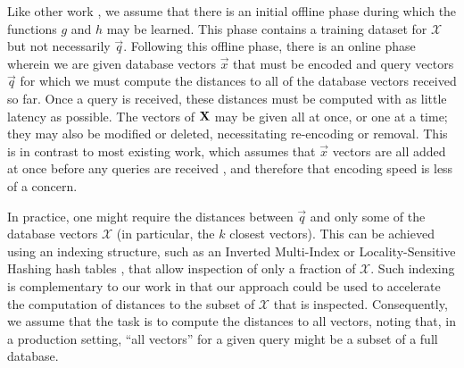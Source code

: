 Like other work \cite{pq,lsq,otq,opq,cq}, we assume that there is an initial offline phase during which the functions $g$ and $h$ may be learned. This phase contains a training dataset for $\mathcal{X}$ but not necessarily $\vec{q}$. Following this offline phase, there is an online phase wherein we are given database vectors $\vec{x}$ that must be encoded and query vectors $\vec{q}$ for which we must compute the distances to all of the database vectors received so far. Once a query is received, these distances must be computed with as little latency as possible. The vectors of $\mathbf{X}$ may be given all at once, or one at a time; they may also be modified or deleted, necessitating re-encoding or removal. This is in contrast to most existing work, which assumes that $\vec{x}$ vectors are all added at once before any queries are received \cite{pq,lsq,otq,opq,cq}, and therefore that encoding speed is less of a concern.

In practice, one might require the distances between $\vec{q}$ and only some of the database vectors $\mathcal{X}$ (in particular, the $k$ closest vectors). This can be achieved using an indexing structure, such as an Inverted Multi-Index \cite{IMI, NOIMI} or Locality-Sensitive Hashing hash tables \cite{E2LSH, crosspolytopeLSH}, that allow inspection of only a fraction of $\mathcal{X}$. Such indexing is complementary to our work in that our approach could be used to accelerate the computation of distances to the subset of $\mathcal{X}$ that is inspected. Consequently, we assume that the task is to compute the distances to all vectors, noting that, in a production setting, ``all vectors'' for a given query might be a subset of a full database.



